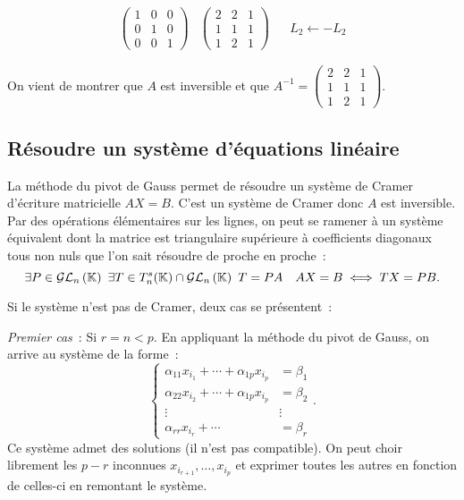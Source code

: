\begin{align}
  \begin{pmatrix}  1 & 0 & 0 \\ 0 & 1 & 0\\ 0 & 0 & 1\end{pmatrix} & \begin{pmatrix} 2 & 2 & 1 \\ 1 & 1 & 1\\ 1 & 2 & 1 \end{pmatrix} && L_2 \leftarrow -L_2
\end{align}

On vient de montrer que \(A\) est inversible et que \(A^{-1}=\begin{pmatrix} 2 & 2 & 1 \\ 1 & 1 & 1\\ 1 & 2 & 1 \end{pmatrix}\).

\subsection{Résoudre un système d'équations linéaire}

La méthode du pivot de Gauss permet de résoudre un système de Cramer d'écriture matricielle \(AX=B\). C'est un système de Cramer donc \(A\) est inversible. Par des opérations élémentaires sur les lignes, on peut se ramener à un système équivalent dont la matrice est triangulaire supérieure à coefficients diagonaux tous non nuls que l'on sait résoudre de proche en proche~:
\begin{equation}
  \exists P \in \mathcal{GL}_{n}\left(\mathbb{K}\right) \ \exists T \in T_n^s(\mathbb{K}) \cap \mathcal{GL}_{n}\left(\mathbb{K}\right) \ T=PA \quad AX=B \iff TX=PB.
\end{equation}

Si le système n'est pas de Cramer, deux cas se présentent~:

\emph{Premier cas}~: Si \(r=n < p\). En appliquant la méthode du pivot de Gauss, on arrive au système de la forme~:
\begin{equation}
  \begin{cases}
    \alpha_{11}x_{i_1} + \dotsb + \alpha_{1p}x_{i_p} &=\beta_1 \\
    \alpha_{22}x_{i_2} + \dotsb + \alpha_{1p}x_{i_p} &=\beta_2 \\
    \vdots & \vdots \\
    \alpha_{rr}x_{i_r} + \dotsb  &=\beta_r
  \end{cases}.
\end{equation}
Ce système admet des solutions (il n'est pas compatible). On peut choir librement les \(p-r\) inconnues \(x_{i_{r+1}}, \ldots, x_{i_p}\) et exprimer toutes les autres en fonction de celles-ci en remontant le système.

